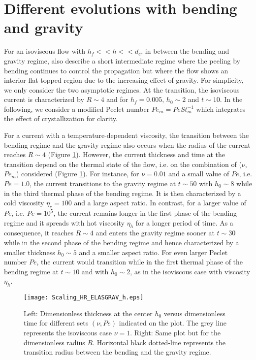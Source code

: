 \section{Different evolutions with bending and gravity}
\label{C3-sec:diff-evol-with-1}

For an  isoviscous flow with $h_f<<  h<< d_c$, in between  the bending
and  gravity  regime,  \citet{Lister:2013ia}  also  describe  a  short
intermediate regime where the peeling  by bending continues to control
the  propagation but  where  the flow  shows  an interior  flat-topped
region due  to the  increasing effect of  gravity. For  simplicity, we
only  consider the  two asymptotic  regimes.  At  the transition,  the
isoviscous current  is characterized by $R\sim4$  and for $h_f=0.005$,
$h_0 \sim 2$ and $t \sim 10$. In the following, we consider a modified
Peclet number  $Pe_m =  Pe St_m^{-1}$ which  integrates the  effect of
crystallization for clarity.

For a  current with a temperature-dependent  viscosity, the transition
between the bending regime and the gravity regime also occurs when the
radius    of     the    current    reaches    $R\sim     4$    (Figure
\ref{C3-Scaling_HR_ELASGRAV_h}).  However, the  current thickness  and
time at the  transition depend on the thermal state  of the flow, i.e.
on    the   combination    of   ($\nu$,$Pe_m$)    considered   (Figure
\ref{C3-Scaling_HR_ELASGRAV_h}).  For  instance, for $\nu=0.01$  and a
small value of $Pe$, i.e.  $Pe  = 1.0$, the current transitions to the
gravity regime  at $t \sim  50$ with $h_0 \sim  8$ while in  the third
thermal phase  of the bending  regime. It  is then characterized  by a
cold viscosity  $\eta_c=100$ and a  large aspect ratio.   In contrast,
for a  larger value  of $Pe$,  i.e.  $Pe=  10^5$, the  current remains
longer in  the first phase of  the bending regime and  it spreads with
hot viscosity $\eta_h$ for a longer period of time.  As a consequence,
it  reaches  $R \sim  4$  and  enters  the  gravity regime  sooner  at
$t\sim 30$ while  in the second phase of the  bending regime and hence
characterized by a smaller thickness  $h_0\sim 5$ and a smaller aspect
ratio.   For  even  larger  Peclet  number  $Pe$,  the  current  would
transition while in  the first thermal phase of the  bending regime at
$t \sim  10$ and  with $h_0 \sim  2$, as in  the isoviscous  case with
viscosity $\eta_h$.

\begin{figure}
  \begin{center}
    \graphicspath{ {/Users/thorey/Documents/These/Projet/Refroidissement/Skin_Model/Figure/JFM_V13/} }
    \texttt{[image: Scaling\_HR\_ELASGRAV\_h.eps]}
    \caption{Left: Dimensionless thickness at  the center $h_0$ versus
      dimensionless time  for different  sets $(\nu,Pe)$  indicated on
      the plot.  The grey line represents the isoviscous case $\nu=1$.
      Right:  Same   plot  but  for  the   dimensionless  radius  $R$.
      Horizontal  black dotted-line  represents the  transition radius
      between the bending and the gravity regime.}
    \label{C3-Scaling_HR_ELASGRAV_h}
  \end{center}
\end{figure}

